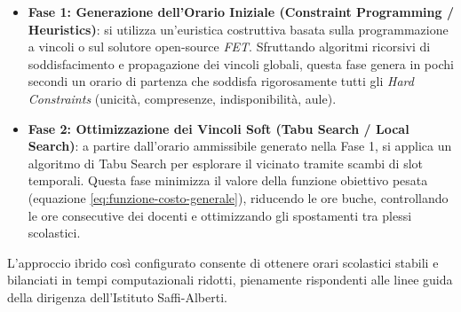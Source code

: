\begin{itemize}
    \item \textbf{Fase 1: Generazione dell'Orario Iniziale (Constraint Programming / Heuristics)}: si utilizza un'euristica costruttiva basata sulla programmazione a vincoli o sul solutore open-source \textit{FET}. Sfruttando algoritmi ricorsivi di soddisfacimento e propagazione dei vincoli globali, questa fase genera in pochi secondi un orario di partenza che soddisfa rigorosamente tutti gli \textit{Hard Constraints} (unicità, compresenze, indisponibilità, aule).
    \item \textbf{Fase 2: Ottimizzazione dei Vincoli Soft (Tabu Search / Local Search)}: a partire dall'orario ammissibile generato nella Fase 1, si applica un algoritmo di Tabu Search per esplorare il vicinato tramite scambi di slot temporali. Questa fase minimizza il valore della funzione obiettivo pesata (equazione \ref{eq:funzione-costo-generale}), riducendo le ore buche, controllando le ore consecutive dei docenti e ottimizzando gli spostamenti tra plessi scolastici.
\end{itemize}
L'approccio ibrido così configurato consente di ottenere orari scolastici stabili e bilanciati in tempi computazionali ridotti, pienamente rispondenti alle linee guida della dirigenza dell'Istituto Saffi-Alberti.
